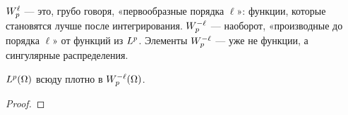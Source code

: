 \begin{idea}[title={Почему индекс отрицательный}]
$W_{p}^{\ell}$ — это, грубо говоря, «первообразные порядка $\ell$»: функции, которые
становятся лучше после интегрирования. $W_{p}^{-\ell}$ — наоборот, «производные до
порядка $\ell$» от функций из $L^{p}$. Элементы $W_{p}^{-\ell}$ — уже не функции, а
сингулярные распределения.
\end{idea}

\begin{proposition}
$L^{p}(\Omega)$ всюду плотно в $W_{p}^{-\ell}(\Omega)$.
\end{proposition}

\begin{proof}
\plusplus
\end{proof}
